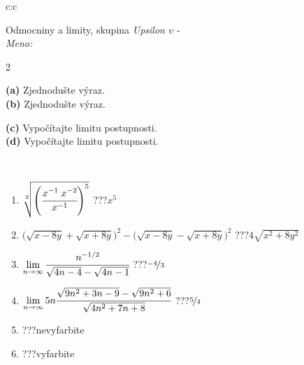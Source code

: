 \documentclass[10pt]{report}
\begin{document}
\begin{tabular}{c:c}
\begin{minipage}[c][104.5mm][t]{0.5\linewidth}
\begin{center}
\vspace{7mm}
{\huge Odmocniny a limity, skupina \textit{Upsilon $\upsilon$} -}\\[5mm]
\textit{Meno:}\phantom{xxxxxxxxxxxxxxxxxxxxxxxxxxxxxxxxxxxxxxxxxxxxxxxxxxxxxxxxxxxxxxxxx}\\[5mm]
\begin{minipage}{0.95\linewidth}
\begin{center}
{\small \begin{multicols}{2} \raggedright
\textbf{(a)} Zjednodušte výraz. \\[1mm]
\textbf{(b)} Zjednodušte výraz. \par \columnbreak
\textbf{(c)} Vypočítajte limitu postupnosti. \\[1mm]
\textbf{(d)} Vypočítajte limitu postupnosti.
\end{multicols}
}
\end{center}
\end{minipage}
\\[4mm]
\begin{minipage}{0.79\linewidth}
\begin{center}
\begin{varwidth}{\linewidth}
\begin{enumerate}
\small
\item $\sqrt[2]{\left(\cfrac{x^{-1}\;x^{-2}}{x^{-1}}\right)^{5}}$\quad \dotfill\; ???\;\dotfill \quad $x^{5}$
\item {\footnotesize{\scriptsize$\big(\sqrt{x-8y}+\sqrt{x+8y}\big)^2-\big(\sqrt{x-8y}-\sqrt{x+8y}\big)^2$}\quad \dotfill\; ???\;\dotfill \quad $4\sqrt{x^2+8y^2}$}
\item $\lim\limits_{n\to\infty}\cfrac{n^{-1/2}}{\sqrt{4n-4}-\sqrt{4n-1}}$\quad \dotfill\; ???\;\dotfill \quad $\nicefrac{-4}{3}$
\item $\lim\limits_{n\to\infty}5n\cfrac{\sqrt{9n^2+3n-9}-\sqrt{9n^2+6}}{\sqrt{4n^2+7n+8}}$\quad \dotfill\; ???\;\dotfill \quad $\nicefrac{5}{4}$
\item \quad \dotfill\; ???\;\dotfill \quad nevyfarbite
\item \quad \dotfill\; ???\;\dotfill \quad vyfarbite
\end{enumerate}
\end{varwidth}
\end{center}
\end{minipage}

\end{center}
\end{minipage}
\end{tabular}
\end{document}
